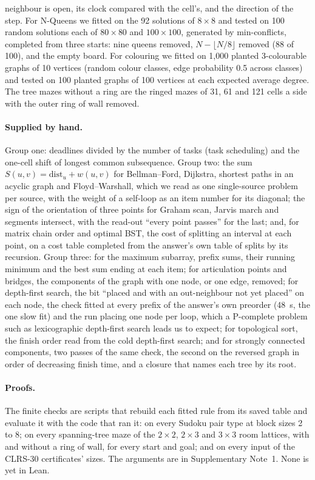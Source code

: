 \documentclass[10pt]{article}
\begin{document}
neighbour is open, its clock compared with the cell's, and the direction of the step. For N-Queens we fitted on the 92
solutions of $8\times8$ and tested on 100 random solutions each of $80\times80$ and $100\times100$, generated by
min-conflicts, completed from three starts: nine queens removed, $N - \lfloor N/8 \rfloor$ removed (88 of 100), and the
empty board. For colouring
we fitted on 1,000 planted 3-colourable graphs of 10 vertices (random colour classes, edge probability 0.5 across
classes) and tested on 100 planted graphs of 100 vertices at each expected average degree. The tree mazes without a ring
are the ringed mazes of 31, 61 and 121 cells a side with the outer ring of wall removed.

\paragraph{Supplied by hand.} Group one: deadlines divided by the number of tasks (task scheduling) and the one-cell
shift of longest common subsequence. Group two: the sum $S(u,v) = \mathrm{dist}_u + w(u,v)$ for Bellman--Ford, Dijkstra,
shortest paths in an acyclic graph and Floyd--Warshall, which we read as one single-source problem per source, with the
weight of a self-loop as an item number for its diagonal; the sign of the orientation of three points for Graham scan,
Jarvis march and segments intersect, with the read-out ``every point passes'' for the last; and, for matrix chain order
and optimal BST, the cost of splitting an interval at each point, on a cost table completed from the answer's
own table of splits by its recursion. Group three: for the maximum subarray, prefix sums, their running minimum and the
best sum ending at each item; for articulation points and bridges, the components of the graph with one node, or one
edge, removed; for depth-first search, the bit ``placed and with an out-neighbour not yet placed'' on each node, the check
fitted at every prefix of the answer's own preorder (48~s, the one slow fit) and the run placing one
node per loop, which a P-complete problem such as lexicographic depth-first search\cite{anderson1987parallelism} leads
us to expect; for
topological sort, the finish order read from the cold depth-first search; and for strongly connected components, two
passes of the same check, the second on the reversed graph in order of decreasing finish time, and a closure that names
each tree by its root.

\paragraph{Proofs.} The finite checks are scripts that rebuild each fitted rule from its saved table and evaluate it with
the code that ran it: on every Sudoku pair type at block sizes 2 to 8; on every spanning-tree maze of the $2\times2$,
$2\times3$ and $3\times3$ room lattices, with and without a ring of wall, for every start and goal; and on every input
of the CLRS-30 certificates' sizes. The arguments are in Supplementary Note~1. None is yet in Lean.
\end{document}
